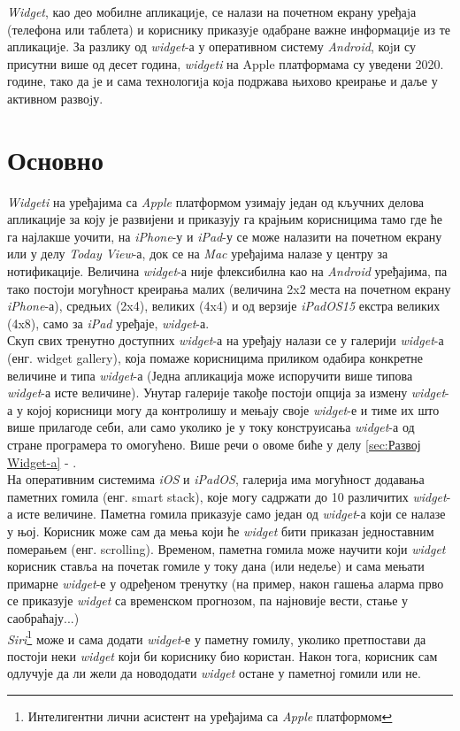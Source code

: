\documentclass[12pt,oneside]{memoir}
\begin{document}
\indent \textit{Widget}, као део мобилне апликациjе, се налази на почетном екрану уређаjа (телефона или таблета) и кориснику приказуjе одабране важне информациjе из те апликациjе. За разлику од \textit{widget}-а у оперативном систему \textit{Android}, коjи су присутни више од десет година, \textit{widgeti} на Apple платформама су уведени 2020. године, тако да jе и сама технологиjа коjа подржава њихово креирање и даље у активном развоjу.

\section{Основно}

\indent \textit{Widgeti} на уређајима са \textit{Apple} платформом узимају један од кључних делова апликације за коју је развијени и приказују га крајњим корисницима тамо где ће га најлакше уочити, на \textit{iPhone}-у и \textit{iPad}-у се може налазити на почетном екрану или у делу \textit{Today View}-а, док се на \textit{Mac} уређајима налазе у центру за нотификације. Величина \textit{widget}-а није флексибилна као на \textit{Android} уређајима, па тако постоји могућност креирања малих (величина 2x2 места на почетном екрану \textit{iPhone}-а), средњих (2x4), великих (4x4) и од верзије \textit{iPadOS15} екстра великих (4x8), само за \textit{iPad} уређаје, \textit{widget}-а. 
\\
\indent Скуп свих тренутно доступних \textit{widget}-а на уређају налази се у галерији \textit{widget}-а (енг. widget gallery), која помаже корисницима приликом одабира конкретне величине и типа \textit{widget}-а (Једна апликација може испоручити више типова \textit{widget}-а исте величине). Унутар галерије такође постоји опција за измену \textit{widget}-а у којој корисници могу да контролишу и мењају своје \textit{widget}-е и тиме их што више прилагоде себи, али само уколико је у току конструисања \textit{widget}-а од стране програмера то омогућено. Више речи о овоме биће у делу \ref{sec:Развој Widget-a} - .
\\
\indent На оперативним системима \textit{iOS} и \textit{iPadOS}, галерија има могућност додавања паметних гомила (енг. smart stack), које могу садржати до 10 различитих \textit{widget}-а исте величине. Паметна гомила приказује само један од \textit{widget}-а који се налазе у њој. Корисник може сам да мења који ће \textit{widget} бити приказан једноставним померањем (енг. scrolling). Временом, паметна гомила може научити који \textit{widget} корисник ставља на почетак гомиле у току дана (или недеље) и сама мењати примарне \textit{widget}-е у одређеном тренутку (на пример, након гашења аларма прво се приказује \textit{widget} са временском прогнозом, па најновије вести, стање у саобраћају...)
\\
\indent \textit{Siri}\footnote{Интелигентни лични асистент на уређајима са \textit{Apple} платформом} може и сама додати \textit{widget}-е у паметну гомилу, уколико претпостави да постоји неки \textit{widget} који би кориснику био користан. Након тога, корисник сам одлучује да ли жели да новододати \textit{widget} остане у паметној гомили или не.
\end{document}
